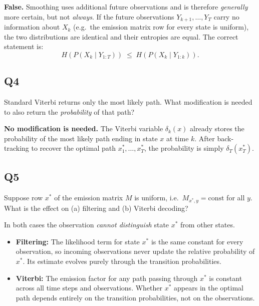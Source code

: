 \documentclass[12pt]{article}
\begin{document}
\begin{tcolorbox}[answerbox]
\textbf{False.} Smoothing uses additional future observations and is therefore
\emph{generally} more certain, but not \emph{always}. If the future observations
$Y_{k+1}, \ldots, Y_T$ carry no information about $X_k$ (e.g.\ the emission matrix
row for every state is uniform), the two distributions are identical and their
entropies are equal. The correct statement is:
\[
  H\!\left(P(X_k \mid Y_{1:T})\right) \;\leq\; H\!\left(P(X_k \mid Y_{1:k})\right).
\]
\end{tcolorbox}

\subsection*{Q4}
\begin{tcolorbox}[questionbox]
Standard Viterbi returns only the most likely path. What modification is needed
to also return the \emph{probability} of that path?
\end{tcolorbox}

\begin{tcolorbox}[answerbox]
\textbf{No modification is needed.} The Viterbi variable $\delta_k(x)$ already stores
the probability of the most likely path ending in state $x$ at time $k$. After
back-tracking to recover the optimal path $x_1^*, \ldots, x_T^*$, the probability
is simply $\delta_T(x_T^*)$.
\end{tcolorbox}

\subsection*{Q5}
\begin{tcolorbox}[questionbox]
Suppose row $x^*$ of the emission matrix $M$ is uniform, i.e.\
$M_{x^*, y} = \text{const}$ for all $y$. What is the effect on (a) filtering
and (b) Viterbi decoding?
\end{tcolorbox}

\begin{tcolorbox}[answerbox]
In both cases the observation \emph{cannot distinguish} state $x^*$ from other
states.

\begin{itemize}
  \item \textbf{Filtering:} The likelihood term for state $x^*$ is the same
        constant for every observation, so incoming observations never update
        the relative probability of $x^*$. Its estimate evolves purely through
        the transition probabilities.
  \item \textbf{Viterbi:} The emission factor for any path passing through $x^*$
        is constant across all time steps and observations. Whether $x^*$ appears
        in the optimal path depends entirely on the transition probabilities, not
        on the observations.
\end{itemize}
\end{tcolorbox}
\end{document}
